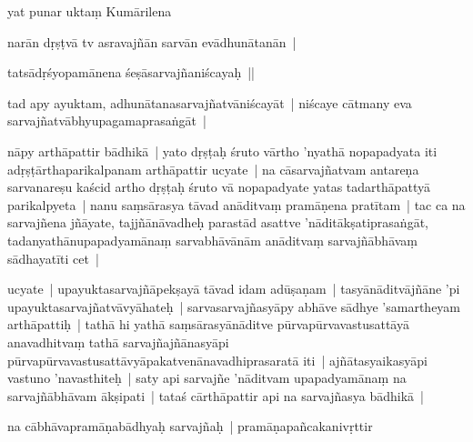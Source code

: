 \documentclass[article,12pt,a4paper]{memoir}%
\newcounter{parCount}
\begin{document}
	  \pstart \leavevmode%
	\label{thakur75-28.1}yat punar uktaṃ Kumārilena 
	{}
	\pend%
      

	  \pstart \leavevmode%
	narān dṛṣṭvā tv asravajñān sarvān evādhunātanān | 
	{}
	\pend%
      

	  \pstart \leavevmode%
	tatsādṛśyopamānena śeṣāsarvajñaniścayaḥ || 
	{}
	\pend%
      

	  \pstart \leavevmode%
	tad apy ayuktam, adhunātanasarvajñatvāniścayāt | niścaye cātmany eva sarvajñatvābhyupagamaprasaṅgāt | 
	{}
	\pend%
      

	  \pstart \leavevmode%
	\label{thakur75-28.6}nāpy arthāpattir bādhikā | yato dṛṣṭaḥ śruto vārtho 'nyathā nopapadyata iti adṛṣṭārthaparikalpanam arthāpattir ucyate | na cāsarvajñatvam antareṇa sarvanareṣu kaścid artho dṛṣṭaḥ śruto vā nopapadyate yatas tadarthāpattyā parikalpyeta | nanu saṃsārasya tāvad anāditvaṃ pramāṇena pratītam | tac ca na sarvajñena jñāyate, tajjñānāvadheḥ parastād asattve 'nāditākṣatiprasaṅgāt, tadanyathānupapadyamānaṃ sarvabhāvānām anāditvaṃ sarvajñābhāvaṃ sādhayatīti cet | 
	{}
	\pend%
      

	  \pstart \leavevmode%
	\label{thakur75-28.12}ucyate | upayuktasarvajñāpekṣayā tāvad idam adūṣaṇam | tasyānāditvājñāne 'pi upayuktasarvajñatvāvyāhateḥ | sarvasarvajñasyāpy abhāve sādhye 'samartheyam arthāpattiḥ | tathā hi yathā saṃsārasyānāditve pūrvapūrvavastusattāyā anavadhitvaṃ tathā sarvajñajñānasyāpi pūrvapūrvavastusattāvyāpakatvenānavadhiprasaratā iti | ajñātasyaikasyāpi vastuno 'navasthiteḥ | saty api sarvajñe 'nāditvam upapadyamānaṃ na sarvajñābhāvam ākṣipati | tataś cārthāpattir api na sarvajñasya bādhikā | 
	{}
	\pend%
      

	  \pstart \leavevmode%
	\label{thakur75-28.18}na cābhāvapramāṇabādhyaḥ sarvajñaḥ | pramāṇapañcakanivṛttir 
	{}
	\pend%
      
\end{document}
